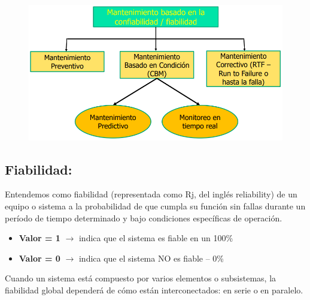 \documentclass[a4paper,oneside,11pt]{article}
\begin{document}
\begin{figure} [ht!]
    \centering
    \includegraphics[scale=0.47]{mantenimiento.png} 
\end{figure}

\subsection{Fiabilidad:}

Entendemos como fiabilidad (representada como Rj, del inglés reliability) de un equipo o sistema a la probabilidad de que cumpla su función sin fallas durante un período de tiempo determinado y bajo condiciones específicas de operación.
\begin{itemize}
    \item \textbf{Valor = 1} $\rightarrow$ indica que el sistema es fiable en un 100\%
    \item \textbf{Valor = 0} $\rightarrow$ indica que el sistema NO es fiable – 0\%
\end{itemize}

Cuando un sistema está compuesto por varios elementos o subsistemas, la fiabilidad global dependerá de cómo están interconectados: en serie o en paralelo.
\end{document}
